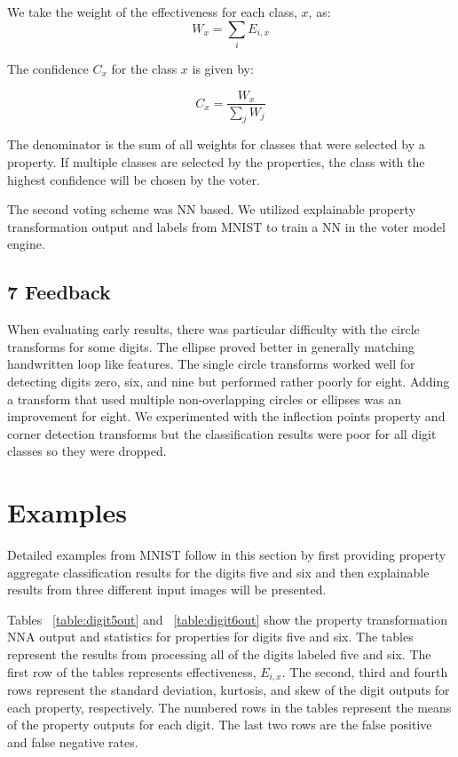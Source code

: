 \documentclass[conference]{IEEEtran}
\begin{document}
We take the weight of the effectiveness for each class, $x$, as:
\begin{equation}\label{weight}
W_x=\sum_i E_{i, x}
\end{equation}

The confidence $C_x$ for the class $x$ is given by:

\begin{equation}\label{conf}
C_x=\frac{W_x}{\sum\limits_jW_j}
\end{equation}

The denominator is the sum of all weights for classes that were selected by a property.  If multiple classes are selected by the properties, the class with the highest confidence will be chosen by the voter.

The second voting scheme was NN based.  We utilized explainable property transformation output and labels from MNIST to train a NN in the voter model engine.

\subsection{7 Feedback}

When evaluating early results, there was particular difficulty with the circle transforms for some digits.  The ellipse proved better in generally matching handwritten loop like features.  The single circle transforms worked well for detecting digits zero, six, and nine but performed rather poorly for eight.  Adding a transform that used multiple non-overlapping circles or ellipses was an improvement for eight.  We experimented with the inflection points property and corner detection transforms but the classification results were poor for all digit classes so they were dropped.

\section{Examples}

Detailed examples from MNIST follow in this section by first providing property aggregate classification results for the digits five and six and then explainable results from three different input images will be presented.

Tables ~\ref{table:digit5out} and ~\ref{table:digit6out} show the property transformation NNA output and statistics for properties for digits five and six.  The tables represent the results from processing all of the digits labeled five and six.  The first row of the tables represents effectiveness, $E_{i,x}$.  The second, third and fourth rows represent the standard deviation, kurtosis, and skew of the digit outputs for each property, respectively.  The numbered rows in the tables represent the means of the property outputs for each digit.  The last two rows are the false positive and false negative rates.
\end{document}
